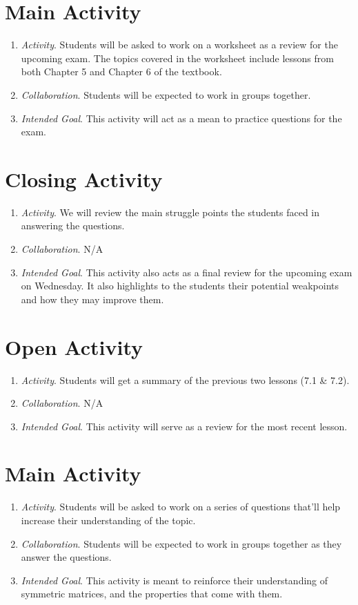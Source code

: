 \documentclass[11pt]{article}
\begin{document}
\section{\centering Main Activity}
	\begin{enumerate}
		\item \textit{Activity}. Students will be asked to work on a worksheet as a review for the upcoming exam. The topics covered in the worksheet include
						lessons from both Chapter 5 and Chapter 6 of the textbook.
		\item \textit{Collaboration}. Students will be expected to work in groups together.
		\item \textit{Intended Goal}. This activity will act as a mean to practice questions for the exam.
	\end{enumerate}

\section{\centering Closing Activity}
	\begin{enumerate}
		\item \textit{Activity}. We will review the main struggle points the students faced in answering the questions.
		\item \textit{Collaboration}. N/A
		\item \textit{Intended Goal}. This activity also acts as a final review for the upcoming exam on Wednesday. It also highlights to the students their 
							potential weakpoints and how they may improve them.
	\end{enumerate}

\newpage
{}
\section{\centering Open Activity}
	\begin{enumerate}
		\item \textit{Activity}. Students will get a summary of the previous two lessons (7.1 \& 7.2).
		\item \textit{Collaboration}.  N/A
		\item \textit{Intended Goal}. This activity will serve as a review for the most recent lesson.
	\end{enumerate}

\section{\centering Main Activity}
	\begin{enumerate}
		\item \textit{Activity}. Students will be asked to work on a series of questions that'll help increase their understanding of the topic.
		\item \textit{Collaboration}. Students will be expected to work in groups together as they answer the questions.
		\item \textit{Intended Goal}. This activity is meant to reinforce their understanding of symmetric matrices, and the properties that come with them.
	\end{enumerate}
\end{document}
